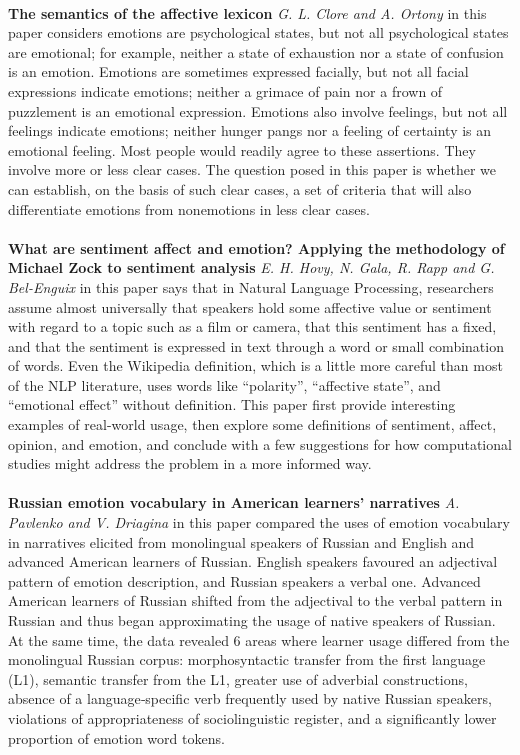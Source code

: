 \documentclass[a4paper,12pt,oneside]{article}
\begin{document}
\paragraph{}
\textbf{The semantics of the affective lexicon} 
\textit{G. L. Clore and A. Ortony} in this paper considers
emotions are psychological states, but not all psychological states are emotional; for example, neither a state of exhaustion nor a state of confusion is an emotion. Emotions are sometimes expressed facially, but not all facial expressions indicate emotions; neither a grimace of pain nor a frown of puzzlement is an emotional expression. Emotions also involve feelings, but not all feelings indicate emotions; neither hunger pangs nor a feeling of certainty is an emotional feeling. Most people would readily agree to these assertions. They involve more or less clear cases. The question posed in this paper is whether we can establish, on the basis of such clear cases, a set of criteria that will also differentiate emotions from nonemotions in less clear cases.
\paragraph{}
\textbf{What are sentiment affect and emotion? Applying the methodology of Michael Zock to sentiment analysis} 
\textit{E. H. Hovy, N. Gala, R. Rapp and G. Bel-Enguix} in this paper says that
in Natural Language Processing, researchers assume almost universally that speakers hold some affective value or sentiment with regard to a topic such as a film or camera, that this sentiment has a fixed, and that the sentiment is expressed in text through a word or small combination of words. Even the Wikipedia definition, which is a little more careful than most of the NLP literature, uses words like “polarity”, “affective state”, and “emotional effect” without definition. This paper first provide interesting examples of real-world usage, then explore some definitions of sentiment, affect, opinion, and emotion, and conclude with a few suggestions for how computational studies might address the problem in a more informed way.
\paragraph{}
\textbf{Russian emotion vocabulary in American learners’ narratives} 
\textit{A. Pavlenko and V. Driagina} in this paper
compared the uses of emotion vocabulary in narratives elicited from monolingual speakers of Russian and English and advanced American learners of Russian. English speakers favoured an adjectival pattern of emotion description, and Russian speakers a verbal one. Advanced American learners of Russian shifted from the adjectival to the verbal pattern in Russian and thus began approximating the usage of native speakers of Russian. At the same time, the data revealed 6 areas where learner usage differed from the monolingual Russian corpus: morphosyntactic transfer from the first language (L1), semantic transfer from the L1, greater use of adverbial constructions, absence of a language‐specific verb frequently used by native Russian speakers, violations of appropriateness of sociolinguistic register, and a significantly lower proportion of emotion word tokens.
\end{document}
